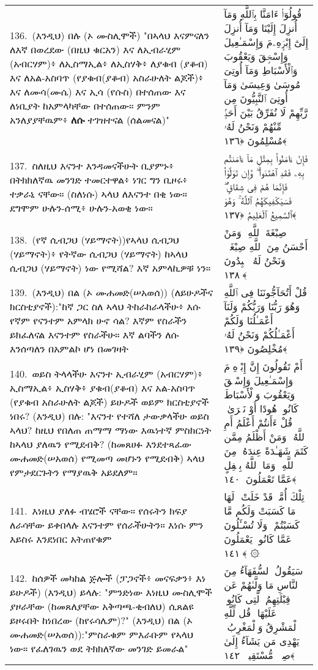\documentclass[11pt,a4paper,oneside]{article}%
\newcommand{\mytextarabic}[1]{\textarabic{ #1 \flushright}}
\begin{document}
\begin{longtable}{%
  @{}
    p{}
  @{~~~}
    p{}
    @{}
}
136.\ (እንዲህ) በሉ (ኦ ሙስሊሞች) "በኣላህ እናምናለን ለእኛ በወረደው (በዚህ ቁርአን) እና ለኢብራሂም (አብርሃም)፥ ለኢስማኢል፥ ለኢስሃቅ፥ ለያቁብ (ያቆብ) እና ለአል-አስባጥ (የያቁብ(ያቆብ) አስራሁለት ልጆች)፥ እና ለሙሳ(ሙሴ) እና ኢሳ (የሱስ) በተሰጠው እና ለነቢያት ከአምላካቸው በተሰጠው። ምንም አንለያያቸዉም፥  {\bf ለሱ} ተገዝተናል (ሰልመናል)" &  \mytextarabic{ قُولُوٓا۟ ءَامَنَّا بِٱللَّهِ وَمَآ أُنزِلَ إِلَيْنَا وَمَآ أُنزِلَ إِلَىٰٓ إِبْرَٟهِۦمَ وَإِسْمَـٰعِيلَ وَإِسْحَٟقَ وَيَعْقُوبَ وَٱلْأَسْبَاطِ وَمَآ أُوتِىَ مُوسَىٰ وَعِيسَىٰ وَمَآ أُوتِىَ ٱلنَّبِيُّونَ مِن رَّبِّهِمْ لَا نُفَرِّقُ بَيْنَ أَحَدٍۢ مِّنْهُمْ وَنَحْنُ لَهُۥ مُسْلِمُونَ ﴿١٣٦﴾}\\
137.\ ስለዚህ እናንተ እንዳመናችሁት ቢያምኑ፥ በትክክለኛዉ መንገድ ተመርተዋል፥ ነገር ግን ቢዞሩ፥ ተቃራኒ ናቸው። (ስለነሱ) ኣላህ ለእናንተ በቂ ነው። ደግሞም ሁሉን-ሰሚ፥ ሁሉን-አወቂ ነው። &  \mytextarabic{ فَإِنْ ءَامَنُوا۟ بِمِثْلِ مَآ ءَامَنتُم بِهِۦ فَقَدِ ٱهْتَدَوا۟ ۖ وَّإِن تَوَلَّوْا۟ فَإِنَّمَا هُمْ فِى شِقَاقٍۢ ۖ فَسَيَكْفِيكَهُمُ ٱللَّهُ ۚ وَهُوَ ٱلسَّمِيعُ ٱلْعَلِيمُ ﴿١٣٧﴾}\\
138.\ (የኛ ሲብጋህ (ሃይማኖት))የኣላህ ሲብጋህ (ሃይማኖት)፥ የትኛው ሲብጋህ (ሃይማኖት) ከኣላህ ሲብጋህ (ሃይማኖት) ነው የሚሻል? እኛ አምላኪዎቹ ነን። &  \mytextarabic{صِبْغَةَ ٱللَّهِ ۖ وَمَنْ أَحْسَنُ مِنَ ٱللَّهِ صِبْغَةًۭ ۖ وَنَحْنُ لَهُۥ عَٟبِدُونَ ﴿١٣٨﴾}\\
139.\ (እንዲህ) በል (ኦ ሙሐመድ(ሠአወሰ)) (ለይሁዶችና ክርስቲያኖች):"ከኛ ጋር ስለ ኣላህ ትከራከራላችሁ፥ እሱ የኛም የናንተም አምላክ ሁኖ ሳል? እኛም የስራችን ይክፈለናል እናንተም የስራችሁ። እኛ ልባችን ለሱ እንሰጣለን በአምልኮ ሆነ በመገዛት &  \mytextarabic{قُلْ أَتُحَآجُّونَنَا فِى ٱللَّهِ وَهُوَ رَبُّنَا وَرَبُّكُمْ وَلَنَآ أَعْمَـٰلُنَا وَلَكُمْ أَعْمَـٰلُكُمْ وَنَحْنُ لَهُۥ مُخْلِصُونَ ﴿١٣٩﴾}\\
140.\ ወይስ ትላላችሁ እናንተ ኢብራሂም (አብርሃም)፥ ኢስማኢል፥ ኢስሃቅ፥ ያቁብ(ያቆብ) እና አል-አስባጥ (የያቁብ አስራሁለት ልጆች) ይሁዶች ወይም ክርስቲያኖች ነበሩ? (እንዲህ) በሉ: "እናንተ የተሻለ ታውቃላችሁ ወይስ ኣላህ? ከዚህ የበለጠ ጠማማ ማነው እዉነተኛ ምስክርነት ከኣላህ ያለዉን የሚደብቅ? (ከመጸሀፉ እንደተጻፈው ሙሐመድ(ሠአወሰ) የሚመጣ መሆኑን የሚደብቅ) ኣላህ የምታደርጉትን የማያዉቅ አይደለም።  &  \mytextarabic{أَمْ تَقُولُونَ إِنَّ إِبْرَٟهِۦمَ وَإِسْمَـٰعِيلَ وَإِسْحَٟقَ وَيَعْقُوبَ وَٱلْأَسْبَاطَ كَانُوا۟ هُودًا أَوْ نَصَٟرَىٰ ۗ قُلْ ءَأَنتُمْ أَعْلَمُ أَمِ ٱللَّهُ ۗ وَمَنْ أَظْلَمُ مِمَّن كَتَمَ شَهَـٰدَةً عِندَهُۥ مِنَ ٱللَّهِ ۗ وَمَا ٱللَّهُ بِغَٟفِلٍ عَمَّا تَعْمَلُونَ ﴿١٤٠﴾}\\
141.\ እነዚህ ያለፉ ብሄሮች ናቸው። የሰሩትን ክፍያ ለራሳቸው ይቀበላሉ እናንተም የሰራችሁትን። እነሱ ምን እይስሩ እንደነበር አትጠየቁም &  \mytextarabic{ تِلْكَ أُمَّةٌۭ قَدْ خَلَتْ ۖ لَهَا مَا كَسَبَتْ وَلَكُم مَّا كَسَبْتُمْ ۖ وَلَا تُسْـَٔلُونَ عَمَّا كَانُوا۟ يَعْمَلُونَ ﴿١٤١﴾ ۞ }\\
142.\ ከሰዎች መካከል ጅሎች (ፓጋኖች፥ መናፍቃን፥ እነ ይሁዶች) (እንዲህ) ይላሉ: "ምንድነው እነዚህ ሙስሊሞች ያዞራቸው (ከመጸለያቸው አቅጣጫ-ቂብለህ) ሲጸልዩ ይዞሩበት ከነበረው (ከየሩሳሌም)?" (እንዲህ) በል (ኦ ሙሐመድ(ሠአወሰ)):"ምስራቁም ምእራቡም የኣላህ ነው። የፈለገዉን ወደ ትክክለኛው መንገድ ይመራል"  &  \mytextarabic{سَيَقُولُ ٱلسُّفَهَآءُ مِنَ ٱلنَّاسِ مَا وَلَّىٰهُمْ عَن قِبْلَتِهِمُ ٱلَّتِى كَانُوا۟ عَلَيْهَا ۚ قُل لِّلَّهِ ٱلْمَشْرِقُ وَٱلْمَغْرِبُ ۚ يَهْدِى مَن يَشَآءُ إِلَىٰ صِرَٟطٍۢ مُّسْتَقِيمٍۢ ﴿١٤٢﴾}\\

\end{longtable}
\end{document}
